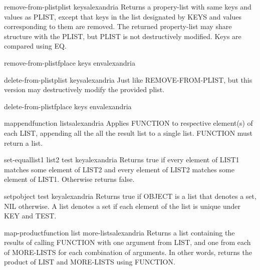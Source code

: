 \begin{function}{remove-from-plist}{plist \rest keys}{alexandria}{}
  Returns a propery-list with same keys and values as PLIST, except that keys
in the list designated by KEYS and values corresponding to them are removed.
The returned property-list may share structure with the PLIST, but PLIST is
not destructively modified. Keys are compared using EQ.
\end{function}

\begin{macro}{remove-from-plistf}{place \rest keys \env env}{alexandria}{}
  
\end{macro}

\begin{function}{delete-from-plist}{plist \rest keys}{alexandria}{}
  Just like REMOVE-FROM-PLIST, but this version may destructively modify the
provided plist.
\end{function}

\begin{macro}{delete-from-plistf}{place \rest keys \env env}{alexandria}{}
  
\end{macro}

\begin{function}{mappend}{function \rest lists}{alexandria}{}
  Applies FUNCTION to respective element(s) of each LIST, appending all the
all the result list to a single list. FUNCTION must return a list.
\end{function}

\begin{function}{set-equal}{list1 list2 \key test key}{alexandria}{}
  Returns true if every element of LIST1 matches some element of LIST2 and
every element of LIST2 matches some element of LIST1. Otherwise returns false.
\end{function}

\begin{function}{setp}{object \key test key}{alexandria}{}
  Returns true if OBJECT is a list that denotes a set, NIL otherwise. A list
denotes a set if each element of the list is unique under KEY and TEST.
\end{function}

\begin{function}{map-product}{function list \rest more-lists}{alexandria}{}
  Returns a list containing the results of calling FUNCTION with one argument
from LIST, and one from each of MORE-LISTS for each combination of arguments.
In other words, returns the product of LIST and MORE-LISTS using FUNCTION.
\end{function}

